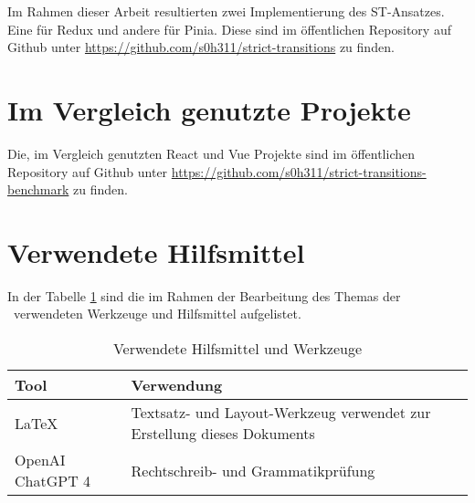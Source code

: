 Im Rahmen dieser Arbeit resultierten zwei Implementierung des ST-Ansatzes. Eine für Redux und andere für Pinia. Diese sind im öffentlichen Repository auf Github unter \url{https://github.com/s0h311/strict-transitions} zu finden.

\section{Im Vergleich genutzte Projekte} \label{ap:githubRepository}

Die, im Vergleich genutzten React und Vue Projekte sind im öffentlichen Repository auf Github unter \url{https://github.com/s0h311/strict-transitions-benchmark} zu finden.

\section{Verwendete Hilfsmittel}
In der Tabelle \ref{tab:tooling} sind die im Rahmen der Bearbeitung des Themas der \IthesisKindDE~verwendeten Werkzeuge und Hilfsmittel aufgelistet.

\begin{table}[h!]
\caption{Verwendete Hilfsmittel und Werkzeuge}
\begin{tabular}{|l|l|}
\hline 
\rowcolor{lightgray} Tool & Verwendung \\
\hline
\LaTeX & Textsatz- und Layout-Werkzeug verwendet zur Erstellung dieses Dokuments \\
\hline
OpenAI ChatGPT 4 & Rechtschreib- und Grammatikprüfung \\
\hline
\end{tabular}
\label{tab:tooling}
\end{table}

